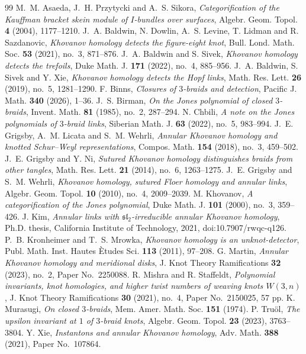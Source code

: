 \documentclass[10pt,a4paper]{amsart}
\begin{document}
\begin{thebibliography}{99}
 M.~M. Asaeda, J.~H. Przytycki and A.~S. Sikora, \emph{Categorification of the Kauffman bracket skein module of \(I\)-bundles over surfaces}, Algebr. Geom. Topol. \textbf{4} (2004), 1177--1210.
 J.~A. Baldwin, N. Dowlin, A.~S. Levine, T. Lidman and R. Sazdanovic, \emph{Khovanov homology detects the figure-eight knot}, Bull. Lond. Math. Soc. \textbf{53} (2021), no.~3, 871--876.
 J.~A. Baldwin and S. Sivek, \emph{Khovanov homology detects the trefoils}, Duke Math. J. \textbf{171} (2022), no.~4, 885--956.
 J.~A. Baldwin, S. Sivek and Y. Xie, \emph{Khovanov homology detects the Hopf links}, Math. Res. Lett. \textbf{26} (2019), no.~5, 1281--1290.
 F. Binns, \emph{Closures of \(3\)-braids and detection}, Pacific J. Math. \textbf{340} (2026), 1--36.
 J.~S. Birman, \emph{On the Jones polynomial of closed \(3\)-braids}, Invent. Math. \textbf{81} (1985), no.~2, 287--294.
 N. Chbili, \emph{A note on the Jones polynomials of \(3\)-braid links}, Siberian Math. J. \textbf{63} (2022), no.~5, 983--994.
 J.~E. Grigsby, A.~M. Licata and S.~M. Wehrli, \emph{Annular Khovanov homology and knotted Schur--Weyl representations}, Compos. Math. \textbf{154} (2018), no.~3, 459--502.
 J.~E. Grigsby and Y. Ni, \emph{Sutured Khovanov homology distinguishes braids from other tangles}, Math. Res. Lett. \textbf{21} (2014), no.~6, 1263--1275.
 J.~E. Grigsby and S.~M. Wehrli, \emph{Khovanov homology, sutured Floer homology and annular links}, Algebr. Geom. Topol. \textbf{10} (2010), no.~4, 2009--2039.
 M. Khovanov, \emph{A categorification of the Jones polynomial}, Duke Math. J. \textbf{101} (2000), no.~3, 359--426.
 J. Kim, \emph{Annular links with \(\mathfrak{sl}_2\)-irreducible annular Khovanov homology}, Ph.D. thesis, California Institute of Technology, 2021, {doi:10.7907/rwqc-q126}.
 P.~B. Kronheimer and T.~S. Mrowka, \emph{Khovanov homology is an unknot-detector}, Publ. Math. Inst. Hautes \`Etudes Sci. \textbf{113} (2011), 97--208.
 G. Martin, \emph{Annular Khovanov homology and meridional disks}, J. Knot Theory Ramifications \textbf{32} (2023), no.~2, Paper No.~2250088.
 R. Mishra and R. Staffeldt, \emph{Polynomial invariants, knot homologies, and higher twist numbers of weaving knots \(W(3,n)\)}, J. Knot Theory Ramifications \textbf{30} (2021), no.~4, Paper No.~2150025, 57 pp.
 K. Murasugi, \emph{On closed \(3\)-braids}, Mem. Amer. Math. Soc. \textbf{151} (1974).
 P. Tru\"ol, \emph{The upsilon invariant at \(1\) of \(3\)-braid knots}, Algebr. Geom. Topol. \textbf{23} (2023), 3763--3804.
 Y. Xie, \emph{Instantons and annular Khovanov homology}, Adv. Math. \textbf{388} (2021), Paper No.~107864.
\end{thebibliography}
\end{document}
